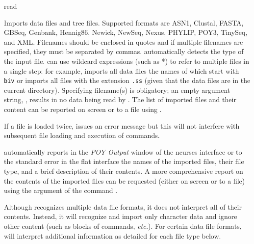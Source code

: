 \begin{command}{read}{}


	\begin{poydescription} 
        Imports data files and tree files.  Supported formats are ASN1, Clustal, FASTA,
        GBSeq, Genbank, Hennig86, Newick, NewSeq, Nexus, PHYLIP, POY3,
        TinySeq, and XML. Filenames should be enclosed in quotes and if multiple
        filenames are specified, they must be separated by commas.
         automatically detects the type of the input file.
         can use wildcard expressions (such as *) to
        refer to multiple files in a single step: for example,  imports all data files the names of which start
        with \texttt{biv} or  imports all files with
        the extension \texttt{.ss} (given that the data files are in the current directory).
        Specifying filename(s) is
        obligatory; an empty argument string, , results in no
        data being read by \poy. The list of imported files and their content
        can be reported on screen or to a file using .
        
        If a file is loaded twice, \poy issues an error message but this will not
        interfere with subsequent file loading and execution of commands.
        
       \poy automatically reports in the \emph{POY Output} window of the ncurses
            interface or to the standard error in the flat interface the names
            of the imported files, their file type, and a brief description of
            their contents. A more comprehensive report on the contents of the imported
            files can be requested (either on screen or to a file) using the argument
             of the command .

        \begin{statement}
            Although \poy recognizes multiple data file formats, it does not
            interpret all of their contents. Instead, it will recognize and import
            only character data and ignore other content (such as blocks of
            commands, \emph{etc.}). For certain data file formats, \poy will interpret
            additional information as detailed for each file type below.
        \end{statement}
        

\end{poydescription}
\end{command}
